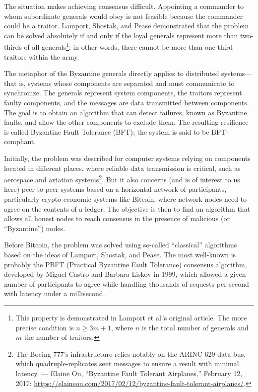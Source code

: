 \documentclass[
  a5paper,
  smalldemyvopaper,10pt,twoside,onecolumn,openright,extrafontsizes,hidelinks]{memoir}
\begin{document}
The situation makes achieving consensus difficult. Appointing a
commander to whom subordinate generals would obey is not feasible
because the commander could be a traitor. Lamport, Shostak, and Pease
demonstrated that the problem can be solved absolutely if and only if
the loyal generals represent more than two-thirds of all
generals\footnote{This property is demonstrated in Lamport et al.'s
  original article. The more precise condition is \(n \ge 3 m + 1\),
  where \(n\) is the total number of generals and \(m\) the number of
  traitors.}; in other words, there cannot be more than one-third
traitors within the army.

The metaphor of the Byzantine generals directly applies to distributed
systems---that is, systems whose components are separated and must
communicate to synchronize. The generals represent system components,
the traitors represent faulty components, and the messages are data
transmitted between components. The goal is to obtain an algorithm that
can detect failures, known as Byzantine faults, and allow the other
components to exclude them. The resulting resilience is called Byzantine
Fault Tolerance (BFT); the system is said to be BFT-compliant.

Initially, the problem was described for computer systems relying on
components located in different places, where reliable data transmission
is critical, such as aerospace and aviation systems\footnote{The Boeing
  777's infrastructure relies notably on the ARINC 629 data bus, which
  quadruple-replicates sent messages to ensure a result with minimal
  latency. --- Elaine Ou, ``Byzantine Fault Tolerant Airplanes,''
  February 12, 2017:
  \url{https://elaineou.com/2017/02/12/byzantine-fault-tolerant-airplanes/}.}.
But it also concerns (and is of interest to us here) peer-to-peer
systems based on a horizontal network of participants, particularly
crypto-economic systems like Bitcoin, where network nodes need to agree
on the contents of a ledger. The objective is then to find an algorithm
that allows all honest nodes to reach consensus in the presence of
malicious (or ``Byzantine'') nodes.

Before Bitcoin, the problem was solved using so-called ``classical''
algorithms based on the ideas of Lamport, Shostak, and Pease. The most
well-known is probably the PBFT (Practical Byzantine Fault Tolerance)
consensus algorithm, developed by Miguel Castro and Barbara Liskov in
1999, which allowed a given number of participants to agree while
handling thousands of requests per second with latency under a
millisecond.
\end{document}
